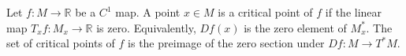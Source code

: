 Let $f: M \to \mathbb{R}$ be a $C^1$ map. A point $x \in M$ is a critical point of $f$ if the linear map $T_x f: M_x \to \mathbb{R}$ is zero. Equivalently, $Df(x)$ is the zero element of $M_x^*$. The set of critical points of $f$ is the preimage of the zero section under $Df: M \to T^*M$.
